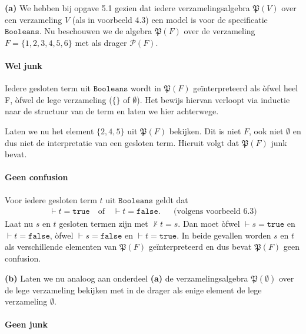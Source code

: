 \documentclass[a4paper,11pt]{article}
\begin{document}
\begin{description}

\item{\bf (a)} %
We hebben bij opgave 5.1 gezien dat iedere verzamelingsalgebra
$\mathfrak{P}(V)$ over een verzameling $V$ (als in voorbeeld 4.3) een model is
voor de specificatie $\texttt{Booleans}$. Nu beschouwen we de algebra
$\mathfrak{P}(F)$ over de verzameling $F=\{1,2,3,4,5,6\}$ met als drager
$\mathcal{P}(F)$.

\paragraph{Wel junk}

Iedere gesloten term uit $\texttt{Booleans}$ wordt in $\mathfrak{P}(F)$
ge\"interpreteerd als \`ofwel heel F, \`ofwel de lege verzameling ($\{\}$ of
$\emptyset$). Het bewijs hiervan verloopt via inductie naar de structuur van
de term en laten we hier achterwege.

Laten we nu het element $\{2,4,5\}$ uit $\mathfrak{P}(F)$ bekijken. Dit is
niet $F$, ook niet $\emptyset$ en dus niet de interpretatie van een gesloten
term. Hieruit volgt dat $\mathfrak{P}(F)$ junk bevat.

\paragraph{Geen confusion}

Voor iedere gesloten term $t$ uit $\texttt{Booleans}$ geldt dat
\begin{align*}
\vdash t = \texttt{true} \quad \text{of} \quad \vdash t = \texttt{false}. &&\text{(volgens voorbeeld 6.3)}
\end{align*}
Laat nu $s$ en $t$ gesloten termen zijn met $\not \vdash t = s$. Dan moet
\`ofwel $\vdash s = \texttt{true}$ en $\vdash t = \texttt{false}$, \`ofwel
$\vdash s = \texttt{false}$ en $\vdash t = \texttt{true}$. In beide gevallen
worden $s$ en $t$ als verschillende elementen van $\mathfrak{P}(F)$
ge\"interpreteerd en dus bevat $\mathfrak{P}(F)$ geen confusion.

\item{\bf (b)} %
Laten we nu analoog aan onderdeel {\bf (a)} de verzamelingsalgebra
$\mathfrak{P}(\emptyset)$ over de lege verzameling bekijken met in de drager
als enige element de lege verzameling $\emptyset$.

\paragraph{Geen junk}


\end{description}
\end{document}
